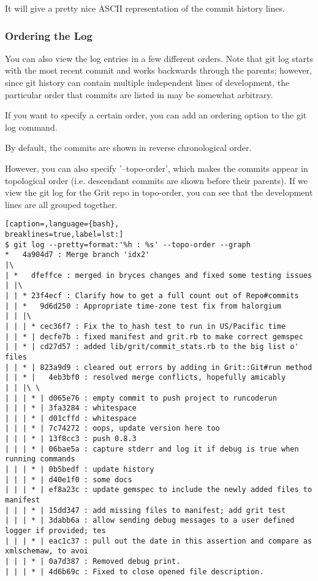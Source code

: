 It will give a pretty nice ASCII representation of the commit history lines.

\subsubsection{Ordering the Log}
You can also view the log entries in a few different orders. Note that git log
starts with the most recent commit and works backwards through the parents;
however, since git history can contain multiple independent lines of
development, the particular order that commits are listed in may be somewhat
arbitrary.

If you want to specify a certain order, you can add an ordering option to the
git log command.

By default, the commits are shown in reverse chronological order.

However, you can also specify '--topo-order', which makes the commits appear in
topological order (i.e. descendant commits are shown before their parents). If
we view the git log for the Grit repo in topo-order, you can see that the
development lines are all grouped together.
\lstset{basicstyle=\scriptsize, numbers=none, captionpos=b, tabsize=4}
\begin{lstlisting}[caption=,language={bash},
breaklines=true,label=lst:]
$ git log --pretty=format:'%h : %s' --topo-order --graph
*   4a904d7 : Merge branch 'idx2'
|\  
| *   dfeffce : merged in bryces changes and fixed some testing issues
| |\  
| | * 23f4ecf : Clarify how to get a full count out of Repo#commits
| | *   9d6d250 : Appropriate time-zone test fix from halorgium
| | |\  
| | | * cec36f7 : Fix the to_hash test to run in US/Pacific time
| | * | decfe7b : fixed manifest and grit.rb to make correct gemspec
| | * | cd27d57 : added lib/grit/commit_stats.rb to the big list o' files
| | * | 823a9d9 : cleared out errors by adding in Grit::Git#run method
| | * |   4eb3bf0 : resolved merge conflicts, hopefully amicably
| | |\ \  
| | | * | d065e76 : empty commit to push project to runcoderun
| | | * | 3fa3284 : whitespace
| | | * | d01cffd : whitespace
| | | * | 7c74272 : oops, update version here too
| | | * | 13f8cc3 : push 0.8.3
| | | * | 06bae5a : capture stderr and log it if debug is true when running commands
| | | * | 0b5bedf : update history
| | | * | d40e1f0 : some docs
| | | * | ef8a23c : update gemspec to include the newly added files to manifest
| | | * | 15dd347 : add missing files to manifest; add grit test
| | | * | 3dabb6a : allow sending debug messages to a user defined logger if provided; tes
| | | * | eac1c37 : pull out the date in this assertion and compare as xmlschemaw, to avoi
| | | * | 0a7d387 : Removed debug print.
| | | * | 4d6b69c : Fixed to close opened file description.
\end{lstlisting}

